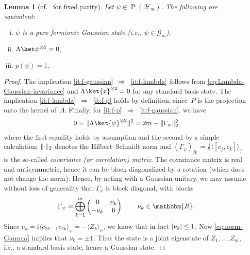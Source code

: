 \documentclass[11pt,a4paper]{article}
\newtheorem{lemma}[theorem]{Lemma}\AddToHook{env/lemma/begin}{\crefalias{theorem}{lemma}}
\numberwithin{equation}{section}
\newcommand{\ot}{\otimes}
\newcommand{\RR}{\mathbbm{R}}
\newcommand{\HH}{\mathcal{H}}
\newcommand{\GG}{\mathcal G}
\newcommand{\1}{\mathbf{1}}
\renewcommand{\P}{\operatorname{P}}
\DeclarePairedDelimiter\abs{\lvert}{\rvert}
\DeclarePairedDelimiter\norm{\lVert}{\rVert}
\begin{document}
\begin{lemma}[{cf.~\cite[Cor.~1]{melo2013power} for fixed parity}]\label{lem:exact fermions}
Let $\psi\in\P(\HH_m)$.
The following are equivalent:
\begin{enumerate}[(i),itemsep=0pt]
    \item\label{it:f-gaussian} $\psi$ is a pure fermionic Gaussian state (i.e., $\psi \in \GG_m$),
    \item\label{it:f-lambda} $\Lambda\ket\psi^{\ot 2}=0$,
    \item\label{it:f-p} $p(\psi)=1$.
\end{enumerate}
\end{lemma}
\begin{proof}
The implication \ref{it:f-gaussian}~$\Rightarrow$~\ref{it:f-lambda} follows from \cref{eq:Lambda-Gaussian-invariance} and $\Lambda \ket{x}^{\ot 2} = 0$ for any standard basis state.
The implication \ref{it:f-lambda}~$\Rightarrow$~\ref{it:f-p} holds by definition, since~$P$ is the projection onto the kernel of~$\Lambda$.
Finally, for \ref{it:f-p}~$\Rightarrow$~\ref{it:f-gaussian}, we have
\begin{align}\label{eq:norm-Gamma}
    0 = \norm{\Lambda \ket{\psi}^{\ot 2}}^2 = 2m - \norm{\Gamma_\psi}_2^2
\end{align}
where the first equality holds by assumption and the second by a simple calculation; $\norm{\cdot}_2$ denotes the Hilbert--Schmidt norm and $(\Gamma_\psi)_{jk} \coloneqq \frac{\mathrm{i}}{2}\langle [c_j, c_k] \rangle_\psi$ is the so-called \emph{covariance (or correlation) matrix}.
The covariance matrix is real and antisymmetric, hence it can be block diagonalized by a rotation (which does not change the norm).
Hence, by acting with a Gaussian unitary, we may assume without loss of generality that $\Gamma_\psi$ is block diagonal, with blocks
    \begin{align*}
        \Gamma_\psi = \bigoplus_{k=1}^m \begin{pmatrix}
            0 & \nu_k \\ -\nu_k & 0
        \end{pmatrix} \, \qquad \nu_k \in \RR.
    \end{align*}
    Since $\nu_k = i\langle c_{2k-1} c_{2k} \rangle_\psi = -\langle Z_k \rangle_\psi$, we know that in fact $\abs{\nu_k} \leq 1$.
    Now \cref{eq:norm-Gamma} implies that $\nu_k = \pm 1$.
    Thus the state is a joint eigenstate of $Z_1, \dots, Z_m$, i.e., a standard basis state, hence a Gaussian state.
\end{proof}
\end{document}
